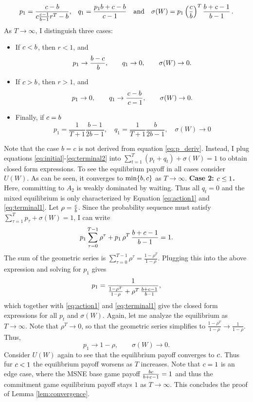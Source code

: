\documentclass[../paper.tex]{subfiles}
\begin{document}
\begin{equation*}
p_1 = \frac{c - b}{c \frac{c-1}{b-1}r^T-b} 
 \text{,} \quad 
q_1 = \frac{p_1 b + c - b}{c - 1}
\quad \text{and} \quad 
\sigma(W) = p_1\left(\frac{c}{b}\right)^T\frac{b + c - 1}{b-1}  \,.
\end{equation*}
As $T\to\infty$, I distinguish three cases:
\begin{itemize}
    \item If $c<b$, then $r<1$, and
    \[
    p_1 \to \frac{b-c}{\,b},\qquad q_1 \to 0,\qquad \sigma(W) \to 0.
    \]
    \item If $c>b$, then $r>1$, and
    \[
    p_1 \to 0,\qquad q_1 \to \frac{c-b}{\,c-1},\qquad \sigma(W) \to 0.
    \]
    \item Finally, if $c=b$
    \[
    p_1=\frac{1}{T+1}\frac{b-1}{2b-1}, \quad q_1 = \frac{1}{T+1}\frac{b}{2b-1}, \quad \sigma(W)\to 0
\]
\end{itemize}
Note that the case $b=c$ is not derived from equation \ref{eq:p_deriv}. Instead, I plug equations \ref{eq:initial}-\ref{eq:terminal2} into $\sum_{t=1}^T(p_t+q_t)+\sigma(W)=1$ to obtain closed form expressions. To see the equilibrium payoff in all cases consider $U(W)$. As can be seen, it converges to $\min\{b,c\}$ as $T\to\infty$.
\newline
\newline
\textbf{Case 2: $c\leq1$.}
Here, committing to $A_2$ is weakly dominated by waiting. Thus all $q_t=0$ and the mixed equilibrium is only characterized by Equation \ref{eq:action1} and \ref{eq:terminal1}.
Let $\rho=\frac{c}{b}$. Since the probability sequence must satisfy $ \sum_{\tau=1}^{T} p_\tau + \sigma(W) = 1 $, I can write 
$$
p_1\sum_{\tau=0}^{T-1} \rho^\tau + p_1\,\rho^{T}\,\frac{b+c-1}{b-1} = 1.
$$
The sum of the geometric series is $\sum_{\tau=0}^{T-1} \rho^\tau = \frac{1-\rho^{T}}{1-\rho}$. Plugging this into the above expression and solving for $p_1$ gives 
\[
p_1 = \frac{1}{\frac{1-\rho^{T}}{1-\rho} + \rho^{T}\,\frac{b+c-1}{b-1}},
\]
which together with \ref{eq:action1} and \ref{eq:terminal1} give the closed form expressions for all $p_t$ and $\sigma(W)$.
Again, let me analyze the equilibrium as $T\to\infty$. Note that $\rho^{T}\to 0$, so that the geometric series simplifies to $\frac{1-\rho^{T}}{1-\rho}\to \frac{1}{1-\rho}$. Thus,
\[
p_1\to 1-\rho,\qquad \sigma(W) \to 0.
\]
Consider $U(W)$ again to see that the equilibrium payoff converges to $c$. Thus fur $c<1$ the equilibrium payoff worsens as $T$ increases. Note that $c=1$ is an edge case, where the MSNE base game payoff $\frac{bc}{b+c-1}=1$ and thus the commitment game equilibrium payoff stays $1$ as $T\to\infty$. This concludes the proof of Lemma \ref{lem:convergence}.
\end{document}
